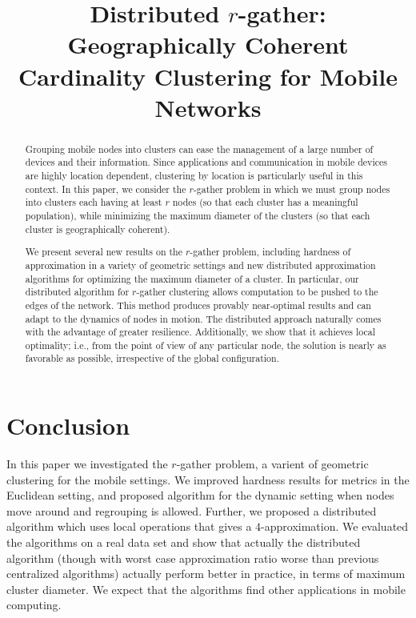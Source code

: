 \documentclass[conference]{IEEEtran}
\title{Distributed $r$-gather: Geographically Coherent Cardinality Clustering for Mobile Networks}
\begin{document}
\maketitle


\begin{abstract}

Grouping mobile nodes into clusters can ease the management of a large number of devices and their information. Since applications and communication in mobile devices are highly location dependent, clustering by location is particularly useful in this context. In this paper, we consider the $r$-gather problem in which we must group nodes into clusters each having at least $r$ nodes (so that each cluster has a meaningful population), while minimizing the maximum diameter of the clusters (so that each cluster is geographically coherent).

We present several new results on the $r$-gather problem, including hardness of approximation in a variety of geometric settings and new distributed approximation algorithms for optimizing the maximum diameter of a cluster. In particular, our distributed algorithm for $r$-gather clustering allows computation to be pushed to the edges of the network. This method produces provably near-optimal results and can adapt to the dynamics of nodes in motion. The distributed approach naturally comes with the advantage of greater resilience. Additionally, we show that it achieves local optimality; i.e., from the point of view of any particular node, the solution is nearly as favorable as possible, irrespective of the global configuration. 

\end{abstract} 


%




\section{Conclusion}
In this paper we investigated the $r$-gather problem, a varient of geometric clustering for the mobile settings. We improved hardness results for metrics in the Euclidean setting, and proposed algorithm for the dynamic setting when nodes move around and regrouping is allowed. Further, we proposed a distributed algorithm which uses local operations that gives a $4$-approximation. We evaluated the algorithms on a real data set and show that actually the distributed algorithm (though with worst case approximation ratio worse than previous centralized algorithms) actually perform better in practice, in terms of maximum cluster diameter. We expect that the algorithms find other applications in mobile computing. 



\begin{small}


\end{small}
\end{document}
